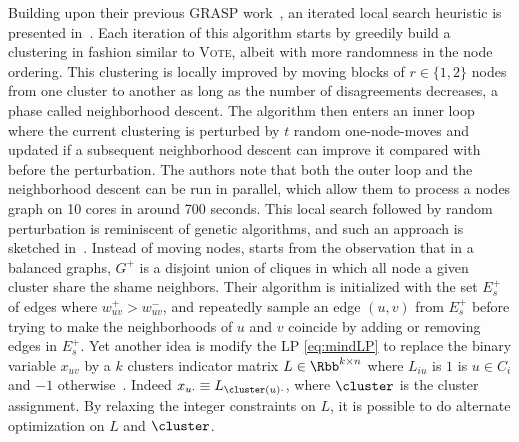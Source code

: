 Building upon their previous GRASP work~\autocite{GRASP13}, an iterated local search heuristic is
presented in~\autocites{Levorato2015}{Levorato2017}. Each iteration of this algorithm starts by
greedily build a clustering in fashion similar to \textsc{Vote}, albeit with more randomness in the
node ordering. This clustering is locally improved by moving blocks of $r\in\{1,2\}$ nodes from one
cluster to another as long as the number of disagreements decreases, a phase called neighborhood
descent. The algorithm then enters an inner loop where the current clustering is perturbed by $t$
random one-node-moves and updated if a subsequent neighborhood descent can improve it compared with
before the perturbation. The authors note that both the outer loop and the neighborhood descent can
be run in parallel, which allow them to process a  nodes graph on 10 cores in around 700
seconds.
This local search followed by random perturbation is reminiscent of genetic algorithms, and such an
approach is sketched in~\autocite{GeneticCC08}. Instead of
moving nodes, \textcite{restoreNeighborhood13} starts from the observation that in a balanced
graphs, $G^+$ is a disjoint union of cliques in which all node a given cluster share the shame
neighbors. Their algorithm is initialized with the set $E_s^+$ of edges where $w^+_{uv} > w^-_{uv}$,
and repeatedly sample an edge $(u,v)$ from $E_s^+$ before trying to make the neighborhoods of $u$
and $v$ coincide by adding or removing edges in $E_s^+$.  Yet another idea is modify the LP
\eqref{eq:mindLP} to replace the binary variable $x_{uv}$ by a $k$ clusters indicator matrix
$L\in\Rbb^{k\times n}$ where $L_{iu}$ is $1$ is $u\in C_i$ and $-1$
otherwise~\autocite{AltOptimLP13}. Indeed $x_{u\cdot} \equiv L_{\cluster(u)\cdot}$, where $\cluster$
is the cluster assignment. By relaxing the integer constraints on $L$, it is possible to do
alternate optimization on $L$ and $\cluster$.
